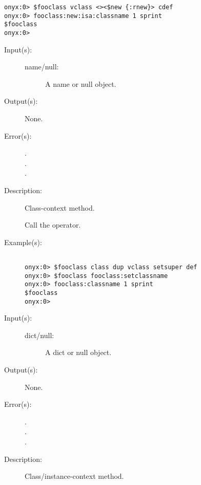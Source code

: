 \begin{description}
\begin{description}
\begin{verbatim}
onyx:0> $fooclass vclass <><$new {:rnew}> cdef
onyx:0> fooclass:new:isa:classname 1 sprint
$fooclass
onyx:0>
		\end{verbatim}
	\end{description}
\label{vclass:setclassname}
\item[{\onyxop{name/null}{setclassname}{--}}: ]
	\begin{description}\item[]
	\item[Input(s): ]
		\begin{description}\item[]
		\item[name/null: ]
			A name or null object.
		\end{description}
	\item[Output(s): ] None.
	\item[Error(s): ]
		\begin{description}\item[]
		\item[.]
		\item[.]
		\item[.]
		\end{description}
	\item[Description: ]
		Class-context method.

		Call the
		operator.
	\item[Example(s): ]\begin{verbatim}

onyx:0> $fooclass class dup vclass setsuper def
onyx:0> $fooclass fooclass:setclassname
onyx:0> fooclass:classname 1 sprint
$fooclass
onyx:0>
		\end{verbatim}
	\end{description}
\label{vclass:setdata}
\item[{\onyxop{dict/null}{setdata}{--}}: ]
	\begin{description}\item[]
	\item[Input(s): ]
		\begin{description}\item[]
		\item[dict/null: ]
			A dict or null object.
		\end{description}
	\item[Output(s): ] None.
	\item[Error(s): ]
		\begin{description}\item[]
		\item[.]
		\item[.]
		\item[.]
		\end{description}
	\item[Description: ]
		Class/instance-context method.


\end{description}
\end{description}
